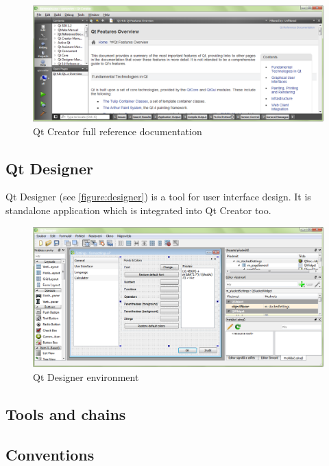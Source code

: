 \begin{figure}[ht]
\centering
\includegraphics[width=14.5cm]{graphics/laboratory/06-qtcreator-help-full.png}
\caption{Qt Creator full reference documentation}\label{figure:qtcreatorhelpfull}
\end{figure}

\subsection{Qt Designer}
Qt Designer (see \autoref{figure:designer}) is a tool for user interface design. It is standalone application which is integrated into Qt Creator too.

\begin{figure}[ht]
\centering
\includegraphics[width=14.5cm]{graphics/laboratory/07-designer.png}
\caption{Qt Designer environment}\label{figure:designer}
\end{figure}

\subsection{Tools and chains}

\subsection{Conventions}
